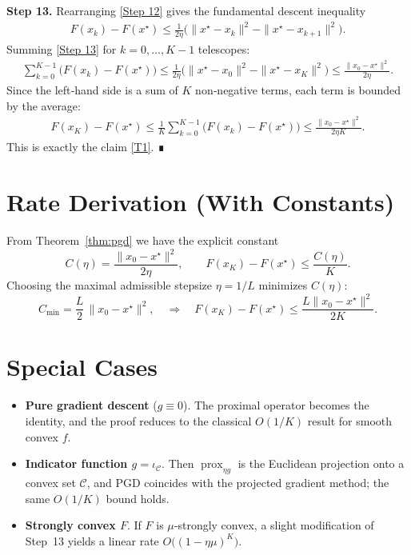 \documentclass{article}
\begin{document}
\noindent\textbf{Step 13.} Rearranging \eqref{Step 12} gives the fundamental descent inequality
\begin{align}
F(x_k)-F(x^\star)
\le \frac{1}{2\eta}\bigl(\|x^\star-x_k\|^2-\|x^\star-x_{k+1}\|^2\bigr). \tag{Step 13}
\end{align}
Summing \eqref{Step 13} for $k=0,\dots,K-1$ telescopes:
\begin{align}
\sum_{k=0}^{K-1}\bigl(F(x_k)-F(x^\star)\bigr)
\le \frac{1}{2\eta}\bigl(\|x^\star-x_0\|^2-\|x^\star-x_{K}\|^2\bigr)
\le \frac{\|x_0-x^\star\|^2}{2\eta}. \tag{Step 14}
\end{align}
Since the left‑hand side is a sum of $K$ non‑negative terms, each term is bounded by the average:
\begin{align}
F(x_{K})-F(x^\star)
\le \frac{1}{K}\sum_{k=0}^{K-1}\bigl(F(x_k)-F(x^\star)\bigr)
\le \frac{\|x_0-x^\star\|^2}{2\eta K}. \tag{Step 15}
\end{align}
This is exactly the claim \eqref{T1}. ∎

\section*{Rate Derivation (With Constants)}
From Theorem~\ref{thm:pgd} we have the explicit constant
\[
C(\eta)=\frac{\|x_0-x^\star\|^2}{2\eta},
\qquad
F(x_K)-F(x^\star)\le \frac{C(\eta)}{K}.
\]
Choosing the maximal admissible stepsize $\eta=1/L$ minimizes $C(\eta)$:
\[
C_{\min}= \frac{L}{2}\,\|x_0-x^\star\|^2,
\quad\Longrightarrow\quad
F(x_K)-F(x^\star)\le \frac{L\|x_0-x^\star\|^2}{2K}.
\]

\section*{Special Cases}
\begin{itemize}
\item \textbf{Pure gradient descent} ($g\equiv0$). The proximal operator becomes the identity, and the proof reduces to the classical $O(1/K)$ result for smooth convex $f$.
\item \textbf{Indicator function $g=\iota_{\mathcal{C}}$}. Then $\operatorname{prox}_{\eta g}$ is the Euclidean projection onto a convex set $\mathcal{C}$, and PGD coincides with the projected gradient method; the same $O(1/K)$ bound holds.
\item \textbf{Strongly convex $F$}. If $F$ is $\mu$‑strongly convex, a slight modification of Step~13 yields a linear rate $O\big((1-\eta\mu)^K\big)$.
\end{itemize}
\end{document}
